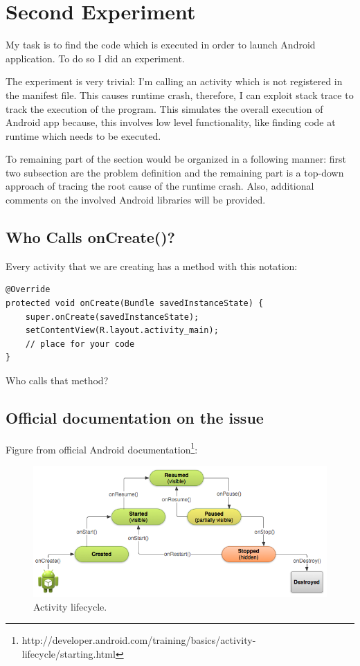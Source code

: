 \documentclass[11pt,a4paper]{article}
\begin{document}
\section{Second Experiment}

My task is to find the code which is executed in order to launch Android application. To do so I did an experiment.

The experiment is very trivial: I'm calling an activity which is not registered in the manifest file. This causes runtime crash, therefore, I can exploit stack trace to track the execution of the program. This simulates the overall execution of Android app because, this involves low level functionality, like finding code at runtime which needs to be executed.

To remaining part of the section would be organized in a following manner: first two subsection are the problem definition and the remaining part is a top-down approach of tracing the root cause of the runtime crash. Also, additional comments on the involved Android libraries will be provided.


\subsection{Who Calls onCreate()?}

Every activity that we are creating has a method with this notation:
\scriptsize\begin{verbatim}
@Override
protected void onCreate(Bundle savedInstanceState) {
    super.onCreate(savedInstanceState);
    setContentView(R.layout.activity_main);
    // place for your code
}
\end{verbatim} 
\normalsize
Who calls that method?

\subsection{Official documentation on the issue}

Figure from official Android documentation\footnote{http://developer.android.com/training/basics/activity-lifecycle/starting.html}:
\begin{figure}[ht]
  \center
  \includegraphics[width=\textwidth]{./images/basiclifecycle.png}
  \caption{Activity lifecycle.}
\end{figure} 
\end{document}
